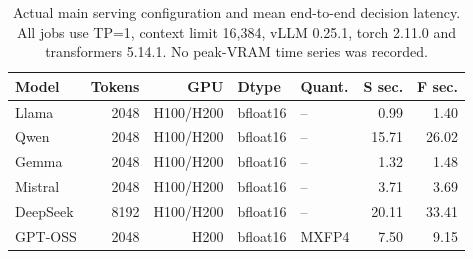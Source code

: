 \begin{table}[t]
\centering
\small
\setlength{\tabcolsep}{4pt}
\begin{tabular}{lrrllrr}
\toprule
Model & Tokens & GPU & Dtype & Quant. & S sec. & F sec. \\
\midrule
Llama & 2048 & H100/H200 & bfloat16 & -- & 0.99 & 1.40 \\
Qwen & 2048 & H100/H200 & bfloat16 & -- & 15.71 & 26.02 \\
Gemma & 2048 & H100/H200 & bfloat16 & -- & 1.32 & 1.48 \\
Mistral & 2048 & H100/H200 & bfloat16 & -- & 3.71 & 3.69 \\
DeepSeek & 8192 & H100/H200 & bfloat16 & -- & 20.11 & 33.41 \\
GPT-OSS & 2048 & H200 & bfloat16 & MXFP4 & 7.50 & 9.15 \\
\bottomrule
\end{tabular}
\caption{Actual main serving configuration and mean end-to-end decision latency. All jobs use TP=1, context limit 16,384, vLLM 0.25.1, torch 2.11.0 and transformers 5.14.1. No peak-VRAM time series was recorded.}
\label{tab:serving}
\end{table}
